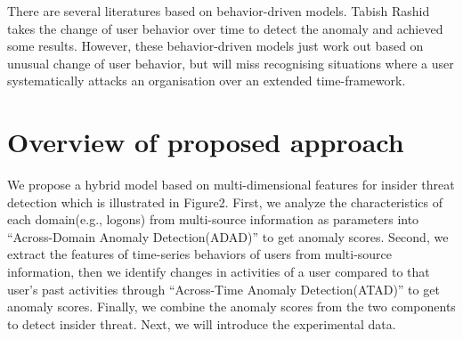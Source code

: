 \documentclass[conference]{IEEEtran}
\begin{document}
There are several literatures based on behavior-driven models\cite{b10}\cite{b11}\cite{b12}. 
Tabish Rashid \cite{b37} takes the change of user behavior  over time to detect the anomaly and achieved some results. However, these behavior-driven models just work out based on unusual change of user behavior, but will miss recognising situations where a user systematically attacks an organisation over an extended time-framework.

\section{Overview of proposed approach}

We propose a hybrid model based on multi-dimensional features for insider threat detection which is illustrated in Figure2. First, we analyze the characteristics of each domain(e.g., logons) from multi-source information as parameters into “Across-Domain Anomaly Detection(ADAD)” to get anomaly scores. Second, we extract the features of time-series behaviors of users from multi-source information, then we identify changes in activities of a user compared to that user’s past activities through “Across-Time Anomaly Detection(ATAD)” to get anomaly scores. Finally, we combine the anomaly scores from the two components to detect insider threat. Next, we will introduce the experimental data. 
\end{document}

